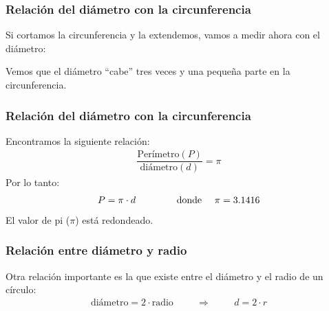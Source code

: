 \documentclass[14pt]{beamer}
\begin{document}
\begin{frame}
\frametitle{Relación del diámetro con la circunferencia}
Si cortamos la circunferencia y la extendemos, vamos a medir ahora con el diámetro:
\pause
\begin{figure}
    \centering
\end{figure}

\pause
Vemos que el diámetro \enquote{cabe} tres veces y una pequeña parte en la circunferencia.
\end{frame}
\begin{frame}
\frametitle{Relación del diámetro con la circunferencia}
Encontramos la siguiente relación:
\pause
\begin{align*}
\dfrac{\text{Perímetro} (P)}{\text{diámetro} (d)} = \pi
\end{align*}
\pause
Por lo tanto:
\pause
\begin{align*}
P = \pi \cdot d \hspace{1.5cm} \text{donde } \quad \pi = 3.1416
\end{align*}
El valor de pi ($\pi$) está redondeado.
\end{frame}
\begin{frame}
\frametitle{Relación entre diámetro y radio}
Otra relación importante es la que existe entre el diámetro y el radio de un círculo:
\pause
\begin{align*}
\text{diámetro} = 2 \cdot \text{radio} \hspace{1cm} \Rightarrow \hspace{1cm} d = 2 \cdot r
\end{align*}
\pause
\vspace*{-1cm}
\begin{figure}
    \centering
\end{figure}
\end{frame}
\end{document}

